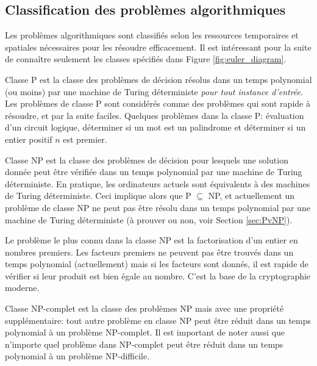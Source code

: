 \documentclass[../main.tex]{subfiles}
\begin{document}
\subsection{Classification des problèmes algorithmiques}
Les problèmes algorithmiques sont classifiés selon les ressources temporaires et spatiales nécessaires pour les résoudre efficacement. Il est intéressant pour la suite de connaître seulement les classes spécifiés dans Figure \ref{fig:euler_diagram}.

\begin{definition}
Classe P est la classe des problèmes de décision résolus dans un temps polynomial (ou moins) par une machine de Turing déterministe \emph{pour tout instance d'entrée}. Les problèmes de classe P sont considérés comme des problèmes qui sont rapide à résoudre, et par la suite faciles. Quelques problèmes dans la classe P: évaluation d'un circuit logique, déterminer si un mot est un palindrome et déterminer si un entier positif $n$ est premier.
\end{definition}

\begin{definition}
Classe NP est la classe des problèmes de décision pour lesquels une solution donnée peut être vérifiée dans un temps polynomial par une machine de Turing déterministe. En pratique, les ordinateurs actuels sont équivalents à des machines de Turing déterministe. Ceci implique alors que P $\subseteq$ NP, et actuellement un problème de classe NP ne peut pas être résolu dans un temps polynomial par une machine de Turing déterministe (à prouver ou non, voir Section \ref{sec:PvNP}).
\end{definition}

Le problème le plus connu dans la classe NP est la factorisation d'un entier en nombres premiers. Les facteurs premiers ne peuvent pas être trouvés dans un temps polynomial (actuellement) mais si les facteurs sont donnés, il est rapide de vérifier si leur produit est bien égale au nombre. C'est la base de la cryptographie moderne.

\begin{definition}
Classe NP-complet est la classe des problèmes NP mais avec une propriété supplémentaire: tout autre problème en classe NP peut être réduit dans un temps polynomial à un problème NP-complet. Il est important de noter aussi que n'importe quel problème dans NP-complet peut être réduit dans un temps polynomial à un problème NP-difficile.
\end{definition}
\end{document}
